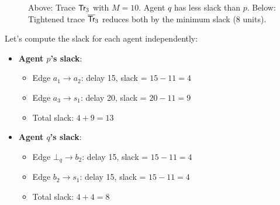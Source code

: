 \begin{figure}
\caption{Above: Trace $\textsf{Tr}_3$ with $M = 10$. Agent $q$ has less slack than $p$. Below: Tightened trace $\overline{\textsf{Tr}}_3$ reduces both by the minimum slack (8 units).}
\label{fig:trace-3}
\end{figure}

Let's compute the slack for each agent independently:

\begin{itemize}
\item \textbf{Agent $p$'s slack}:
  \begin{itemize}
  \item Edge $a_1 \to a_2$: delay 15, slack = $15 - 11 = 4$
  \item Edge $a_3 \to s_1$: delay 20, slack = $20 - 11 = 9$
  \item Total slack: $4 + 9 = 13$
  \end{itemize}

\item \textbf{Agent $q$'s slack}:
  \begin{itemize}
  \item Edge $\bot_q \to b_2$: delay 15, slack = $15 - 11 = 4$
  \item Edge $b_2 \to s_1$: delay 15, slack = $15 - 11 = 4$
  \item Total slack: $4 + 4 = 8$
  \end{itemize}
\end{itemize}

